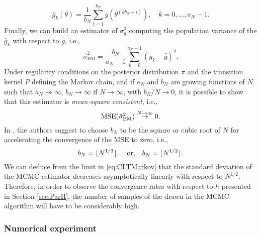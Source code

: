 \begin{equation}
	\bar g_k(\theta) = \frac{1}{b_N} \sum_{i=1}^{b_N} g(\theta^{(kb_N + i)}), \quad k = 0, \ldots, a_N - 1. 
\end{equation} 
Finally, we can build an estimator of $\sigma_g^2$ computing the population variance of the $\bar g_k$ with respect to $\hat g$, i.e.,
\begin{equation}
	\hat\sigma^2_{\mathrm{BM}} = \frac{b_N}{a_N - 1} \sum_{k=0}^{a_N -1}(\bar g_k - \hat g)^2. 
\end{equation}
Under regularity conditions on the posterior distribution $\pi$ and the transition kernel $P$ defining the Markov chain, and if $a_N$ and $b_N$ are growing functions of $N$ such that $a_N \to \infty$, $b_N \to \infty$ if $N \to \infty$, with $b_N / N \to 0$, it is possible to show \cite{FlJ10} that this estimator is \textit{mean-square consistent}, i.e.,
\begin{equation}
	\operatorname{MSE}(\hat\sigma^2_{\mathrm{BM}}) \stackrel{N\to\infty}{\to} 0.
\end{equation}
In \cite{FlJ10}, the authors suggest to choose $b_N$ to be the square or cubic root of $N$ for accelerating the convergence of the MSE to zero, i.e.,
\begin{equation}
	b_N = \lfloor N^{1/3}\rfloor, \quad \text{or,} \quad b_N = \lfloor N^{1/2}\rfloor.
\end{equation}
We can deduce from the limit in \eqref{eq:CLTMarkov} that the standard deviation of the MCMC estimator decreases asymptotically linearly with respect to $N^{1/2}$. Therefore, in order to observe the convergence rates with respect to $h$ presented in Section \ref{sec:ParH}, the number of samples of the drawn in the MCMC algorithm will have to be considerably high.

\subsubsection{Numerical experiment}

